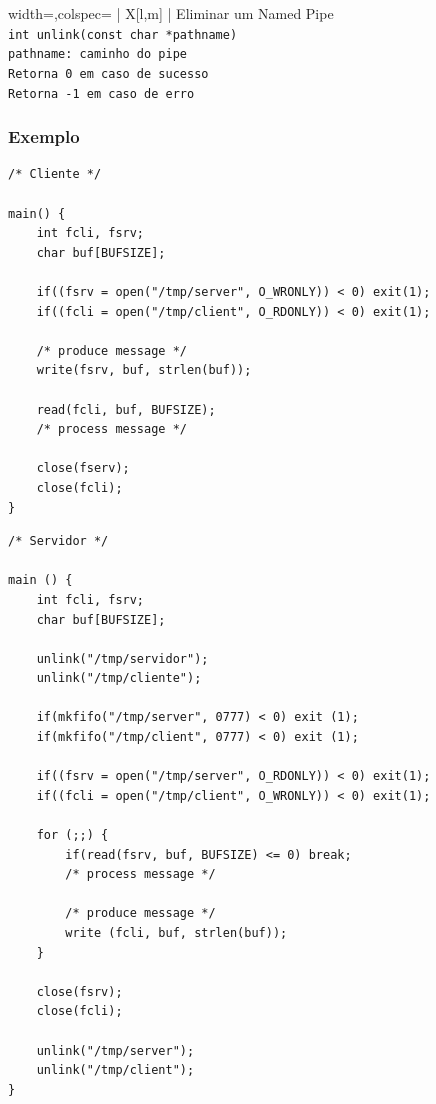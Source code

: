 \documentclass[11pt]{article}
\begin{document}
\begin{tblr}{width=\linewidth,colspec={ | X[l,m] | }}
    \hline
    \centering Eliminar um Named Pipe            \\\hline
    \lstinline|int unlink(const char *pathname)| \\\hline
    \lstinline|pathname: caminho do pipe|        \\\hline
    \lstinline|Retorna 0 em caso de sucesso|     \\
    \lstinline|Retorna -1 em caso de erro|       \\\hline
\end{tblr}

\subsubsection*{Exemplo}

\begin{minipage}[t]{0.5\textwidth}
    \begin{lstlisting}
/* Cliente */

main() {
    int fcli, fsrv;
    char buf[BUFSIZE];

    if((fsrv = open("/tmp/server", O_WRONLY)) < 0) exit(1);
    if((fcli = open("/tmp/client", O_RDONLY)) < 0) exit(1);

    /* produce message */
    write(fsrv, buf, strlen(buf));

    read(fcli, buf, BUFSIZE);
    /* process message */

    close(fserv);
    close(fcli);
}
    \end{lstlisting}
\end{minipage}
\begin{minipage}[t]{0.5\textwidth}
    \begin{lstlisting}
/* Servidor */

main () {
    int fcli, fsrv;
    char buf[BUFSIZE];

    unlink("/tmp/servidor");
    unlink("/tmp/cliente");

    if(mkfifo("/tmp/server", 0777) < 0) exit (1);
    if(mkfifo("/tmp/client", 0777) < 0) exit (1);

    if((fsrv = open("/tmp/server", O_RDONLY)) < 0) exit(1);
    if((fcli = open("/tmp/client", O_WRONLY)) < 0) exit(1);

    for (;;) {
        if(read(fsrv, buf, BUFSIZE) <= 0) break;
        /* process message */
        
        /* produce message */
        write (fcli, buf, strlen(buf));
    }

    close(fsrv);
    close(fcli);

    unlink("/tmp/server");
    unlink("/tmp/client");
}
    \end{lstlisting}
\end{minipage}
\end{document}
